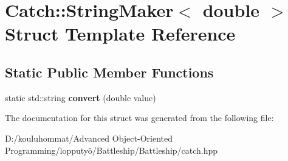 \hypertarget{struct_catch_1_1_string_maker_3_01double_01_4}{}\section{Catch\+:\+:String\+Maker$<$ double $>$ Struct Template Reference}
\label{struct_catch_1_1_string_maker_3_01double_01_4}
\subsection*{Static Public Member Functions}
\begin{DoxyCompactItemize}
\item 
\mbox{\label{struct_catch_1_1_string_maker_3_01double_01_4_acaa61529acad2462292c747d34e5f3d2}} 
static std\+::string {\bfseries convert} (double value)
\end{DoxyCompactItemize}


The documentation for this struct was generated from the following file\+:\begin{DoxyCompactItemize}
\item 
D\+:/kouluhommat/\+Advanced Object-\/\+Oriented Programming/lopputyö/\+Battleship/\+Battleship/catch.\+hpp\end{DoxyCompactItemize}
